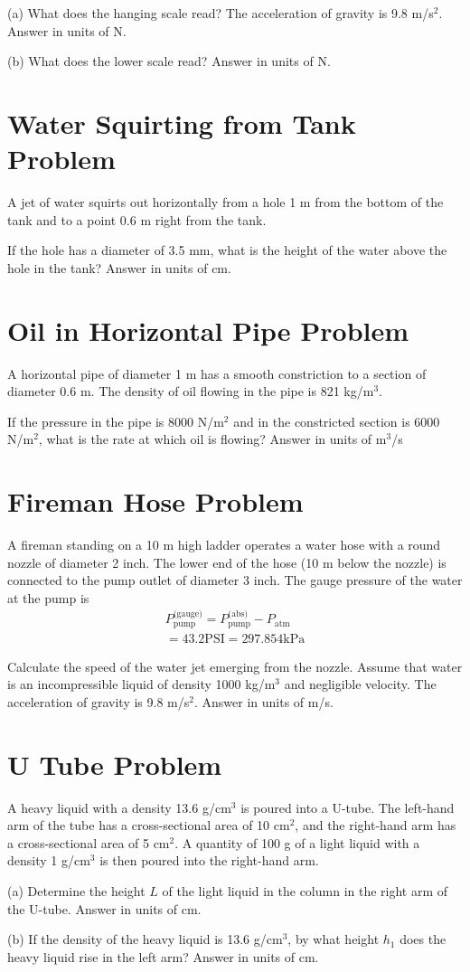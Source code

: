 \documentclass[../physics12.tex]{subfiles}
\begin{document}
(a) What does the hanging scale read? The acceleration of gravity is 9.8 m/s$^2$. Answer in units of N.

(b) What does the lower scale read? Answer in units of N.

\section{Water Squirting from Tank Problem}
A jet of water squirts out horizontally from a hole 1 m from the bottom of the tank and to a point 0.6 m right from the tank.

If the hole has a diameter of 3.5 mm, what is the height of the water above the hole in the tank? Answer in units of cm.

\section{Oil in Horizontal Pipe Problem}
A horizontal pipe of diameter 1 m has a smooth constriction to a section of diameter 0.6 m. The density of oil flowing in the pipe is 821 kg/m$^3$.

If the pressure in the pipe is 8000 N/m$^2$ and in the constricted section is 6000 N/m$^2$, what is the rate at which oil is flowing? Answer in units of m$^3$/s

\section{Fireman Hose Problem}
A fireman standing on a 10 m high ladder operates a water hose with a round nozzle of diameter 2 inch. The lower end of the hose (10 m below the nozzle) is connected to the pump outlet of diameter 3 inch. 
The gauge pressure of the water at the pump is 
\begin{align*}
    P^{\text{(gauge)}}_{\text{pump}}=P^{\text{(abs)}}_{\text{pump}}-P_{\text{atm}}\\
    = 43.2 \text{PSI} = 297.854 \text{kPa}
\end{align*} 

Calculate the speed of the water jet emerging from the nozzle. Assume that water is an incompressible liquid of density 1000 kg/m$^3$ and negligible velocity. The acceleration of gravity is 9.8 m/s$^2$. Answer in units of m/s.
\section{U Tube Problem}
A heavy liquid with a density 13.6 g/cm$^3$ is poured into a U-tube. The left-hand arm of the tube has a cross-sectional area of 10 cm$^2$, and the right-hand arm has a cross-sectional area 
of 5 cm$^2$. A quantity of 100 g of a light liquid with a density 1 g/cm$^3$ is then poured into the right-hand arm.

(a) Determine the height $L$ of the light liquid in the column in the right arm of the U-tube. Answer in units of cm.

(b) If the density of the heavy liquid is 13.6 g/cm$^3$, by what height $h_1$ does the heavy liquid rise in the left arm? Answer in units of cm.
\end{document}
